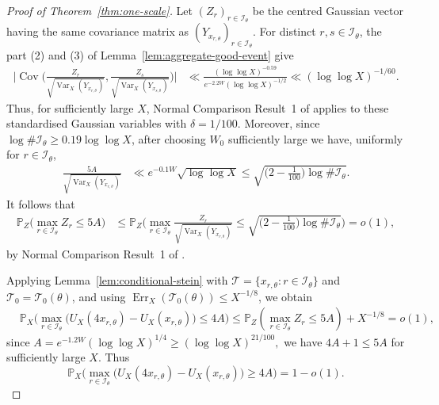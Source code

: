 \documentclass[a4paper,12pt,reqno]{amsart}
\numberwithin{equation}{section}
\theoremstyle{remark}
\newcommand{\p}{\mathbb{P}}
\newcommand{\var}{\operatorname{Var}}
\newcommand{\cov}{\operatorname{Cov}}
\begin{document}
\begin{proof}[Proof of Theorem~\ref{thm:one-scale}]
Let \((Z_r)_{r\in\mathcal I_\theta}\) be the centred Gaussian vector
having the same covariance matrix as
\((Y_{x_{r,\theta}})_{r\in\mathcal I_\theta}\).
For distinct \(r,s\in\mathcal I_\theta\), the part (2) and (3) of Lemma~\ref{lem:aggregate-good-event} give
\[
 \begin{aligned}
 \bigg|
 \cov\bigg(
 \frac{Z_r}{\sqrt{\var_X(Y_{x_{r,\theta}})}},
 \frac{Z_s}{\sqrt{\var_X(Y_{x_{s,\theta}})}}
 \bigg)
 \bigg|
 &\ll
 \frac{(\log\log X)^{-0.59}}
 {e^{-2.2W}(\log\log X)^{-1/2}}\ll(\log\log X)^{-1/60}.
 \end{aligned}
\]
Thus, for sufficiently large \(X\), Normal Comparison Result~1 of
\cite{Harper2023Large} applies to these standardised Gaussian variables
with \(\delta=1/100\). Moreover, since
\(\log\#\mathcal I_\theta\geq0.19\log\log X\), after choosing \(W_0\)
sufficiently large we have, uniformly for \(r\in\mathcal I_\theta\),
\[
 \begin{aligned}
 \frac{5A}{\sqrt{\var_X(Y_{x_{r,\theta}})}}
 &\ll
 e^{-0.1W}\sqrt{\log\log X}\leq
 \sqrt{\big(2-\frac1{100}\big)
 \log\#\mathcal I_\theta}.
 \end{aligned}
\]
It follows that
\[
\begin{aligned}
 \p_Z\Big(
 \max_{r\in\mathcal I_\theta}Z_r\leq5A
 \Big)
 &\leq
 \p_Z\bigg(
 \max_{r\in\mathcal I_\theta}
 \frac{Z_r}{\sqrt{\var_X(Y_{x_{r,\theta}})}}
 \leq
 \sqrt{\big(2-\frac1{100}\big)
 \log\#\mathcal I_\theta}
 \bigg)
 =o(1),
 \end{aligned}
\]
by Normal Comparison Result~1 of \cite{Harper2023Large}.


Applying Lemma~\ref{lem:conditional-stein} with
\(\mathcal T=\{x_{r,\theta}:r\in\mathcal I_\theta\}\) and
\(\mathcal T_0=\mathcal T_0(\theta)\), and using
\(\operatorname{Err}_X(\mathcal T_0(\theta))\leq X^{-1/8}\), we obtain
\[
 \begin{aligned}
 &\p_X\Big(
 \max_{r\in\mathcal I_\theta}
 \big(U_X(4x_{r,\theta})-U_X(x_{r,\theta})\big)
 \leq4A
 \Big)\leq
 \p_Z\left(
 \max_{r\in\mathcal I_\theta}Z_r\leq5A
 \right)+X^{-1/8}
 =o(1),
 \end{aligned}
\]
since
\(
 A=e^{-1.2W}(\log\log X)^{1/4}
 \geq(\log\log X)^{21/100},
\)
we have \(4A+1\leq5A\) for sufficiently large \(X\).
Thus
\begin{equation}\label{eq:fresh-increment-max}
 \p_X\Big(
 \max_{r\in\mathcal I_\theta}
 \big(U_X(4x_{r,\theta})-U_X(x_{r,\theta})\big)
 \geq4A
 \Big)
 =1-o(1).
\end{equation}


\end{proof}
\end{document}
